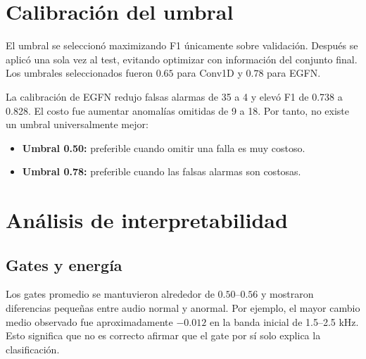 \documentclass[11pt,a4paper]{article}
\begin{document}
\section{Calibración del umbral}

El umbral se seleccionó maximizando F1 únicamente sobre validación. Después se
aplicó una sola vez al test, evitando optimizar con información del conjunto
final. Los umbrales seleccionados fueron \(0.65\) para Conv1D y \(0.78\) para
EGFN.

\begin{table}[ht]
\centering
\caption{Comparación de puntos operativos calibrados.}
\label{tab:calibrated}
\end{table}

La calibración de EGFN redujo falsas alarmas de 35 a 4 y elevó F1 de 0.738 a
0.828. El costo fue aumentar anomalías omitidas de 9 a 18. Por tanto, no existe
un umbral universalmente mejor:

\begin{itemize}
  \item \textbf{Umbral 0.50:} preferible cuando omitir una falla es muy costoso.
  \item \textbf{Umbral 0.78:} preferible cuando las falsas alarmas son costosas.
\end{itemize}

\section{Análisis de interpretabilidad}

\subsection{Gates y energía}

Los gates promedio se mantuvieron alrededor de \(0.50\)--\(0.56\) y mostraron
diferencias pequeñas entre audio normal y anormal. Por ejemplo, el mayor cambio
medio observado fue aproximadamente \(-0.012\) en la banda inicial de
1.5--2.5 kHz. Esto significa que no es correcto afirmar que el gate por sí solo
explica la clasificación.
\end{document}
